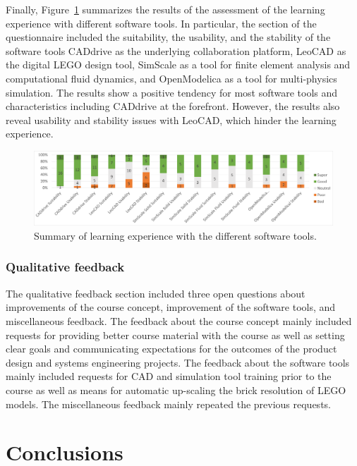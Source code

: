 \documentclass{PDS}
\begin{document}
Finally, Figure~\ref{fig:after-software} summarizes the results of the assessment of the learning experience with different software tools.
In particular, the section of the questionnaire included the suitability, the usability, and the stability of the software tools CADdrive as the underlying collaboration platform, LeoCAD as the digital LEGO design tool, SimScale as a tool for finite element analysis and computational fluid dynamics, and OpenModelica as a tool for multi-physics simulation.
The results show a positive tendency for most software tools and characteristics including CADdrive at the forefront.
However, the results also reveal usability and stability issues with LeoCAD, which hinder the learning experience.

\begin{figure}[htbp]
    \centering
    \includegraphics[width=\textwidth]{./diagrams/after-software.png}
    \caption{Summary of learning experience with the different software tools.}
    \label{fig:after-software}
\end{figure}

\subsubsection{Qualitative feedback}
\label{sec:qualitative}

The qualitative feedback section included three open questions about improvements of the course concept, improvement of the software tools, and miscellaneous feedback.
The feedback about the course concept mainly included requests for providing better course material with the course as well as setting clear goals and communicating expectations for the outcomes of the product design and systems engineering projects.
The feedback about the software tools mainly included requests for CAD and simulation tool training prior to the course as well as means for automatic up-scaling the brick resolution of LEGO models. The miscellaneous feedback mainly repeated the previous requests.

\section{Conclusions}
\label{sec:conclusion}
\end{document}
